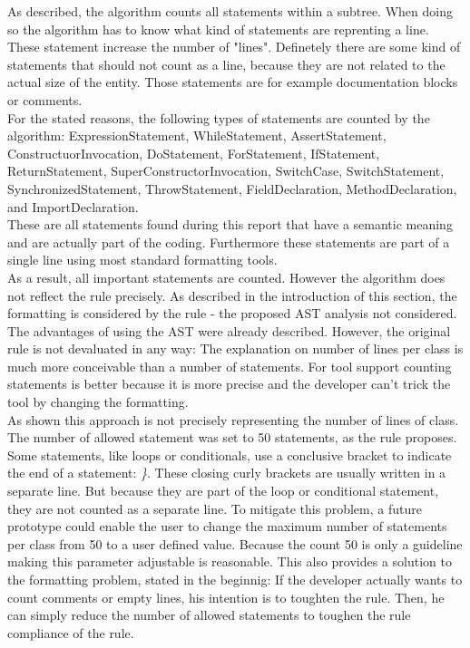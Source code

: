 As described, the algorithm counts all statements within a subtree. When doing so the algorithm has to know what kind of statements are reprenting a line. These statement increase the number of "lines". Definetely there are some kind of statements that should not count as a line, because they are not related to the actual size of the entity. Those statements are for example documentation blocks or comments. 
\\

For the stated reasons, the following types of statements are counted by the algorithm: ExpressionStatement, WhileStatement, AssertStatement, ConstructuorInvocation, DoStatement, ForStatement, IfStatement, ReturnStatement, SuperConstructorInvocation, SwitchCase, SwitchStatement, SynchronizedStatement, ThrowStatement, FieldDeclaration, MethodDeclaration, and ImportDeclaration.
\\

These are all statements found during this report that have a semantic meaning and are actually part of the coding. Furthermore these statements are part of a single line using most standard formatting tools.
\\

As a result, all important statements are counted. However the algorithm does not reflect the rule precisely. As described in the introduction of this section, the formatting is considered by the rule - the proposed \acf{AST} analysis not considered. The advantages of using the \acf{AST} were already described. However, the original rule is not devaluated in any way: The explanation on number of lines per class is much more conceivable than a number of statements. For tool support counting statements is better because it is more precise and the developer can't trick the tool by changing the formatting.
\\

As shown this approach is not precisely representing the number of lines of class. The number of allowed statement was set to 50 statements, as the rule proposes. Some statements, like loops or conditionals, use a conclusive bracket to indicate the end of a statement: \textit{\}}. These closing curly brackets are usually written in a separate line. But because they are part of the loop or conditional statement, they are not counted as a separate line. To mitigate this problem, a future prototype could enable the user to change the maximum number of statements per class from 50 to a user defined value. Because the count 50 is only a guideline making this parameter adjustable is reasonable. This also provides a solution to the formatting problem, stated in the beginnig: If the developer actually wants to count comments or empty lines,  his intention is to toughten the rule. Then, he can simply reduce the number of allowed statements to toughen the rule compliance of the rule. 
\\

